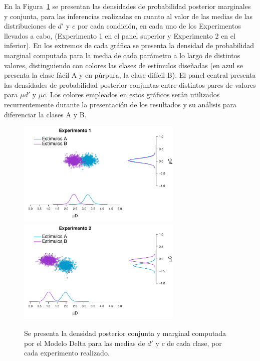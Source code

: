 En la Figura~\ref{fig:Delta_Joints} se presentan las densidades de probabilidad posterior marginales y conjunta, para las inferencias realizadas en cuanto al valor de las medias de las distribuciones de $d'$ y $c$ por cada condición, en cada uno de los Experimentos llevados a cabo, (Experimento 1 en el panel superior y Experimento 2 en el inferior). En los extremos de cada gráfica se presenta la densidad de probabilidad marginal computada para la media de cada parámetro a lo largo de distintos valores, distinguiendo con colores las clases de estímulos diseñadas (en azul se presenta la clase fácil A y en púrpura, la clase difícil B). El panel central presenta las densidades de probabilidad posterior conjuntas entre distintos pares de valores para $\mu d'$ y $\mu c$. Los colores empleados en estos gráficos serán utilizados recurrentemente durante la presentación de los resultados y su análisis para diferenciar la clases A y B.\\ 

\begin{figure}[th]
\centering
\includegraphics[width=0.7\textwidth]{Figures/MDelta_Joint_E1}\\
\includegraphics[width=0.7\textwidth]{Figures/MDelta_Joint_E2}\\
\caption[Modelo Delta: Distribuciones posteriores marginales y conjuntas para $\mu d'$ y $\mu c$ por cada clase de estímulo]{Se presenta la densidad posterior conjunta y marginal computada por el Modelo Delta para las medias de $d'$ y $c$ de cada clase, por cada experimento realizado.}
\label{fig:Delta_Joints}
\end{figure}

